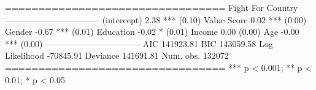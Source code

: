 
=================================
                Fight For Country
---------------------------------
(intercept)          2.38 ***    
                    (0.10)       
Value Score          0.02 ***    
                    (0.00)       
Gender              -0.67 ***    
                    (0.01)       
Education           -0.02 *      
                    (0.01)       
Income               0.00        
                    (0.00)       
Age                 -0.00 ***    
                    (0.00)       
---------------------------------
AIC             141923.81        
BIC             143059.58        
Log Likelihood  -70845.91        
Deviance        141691.81        
Num. obs.       132072           
=================================
*** p < 0.001; ** p < 0.01; * p < 0.05
